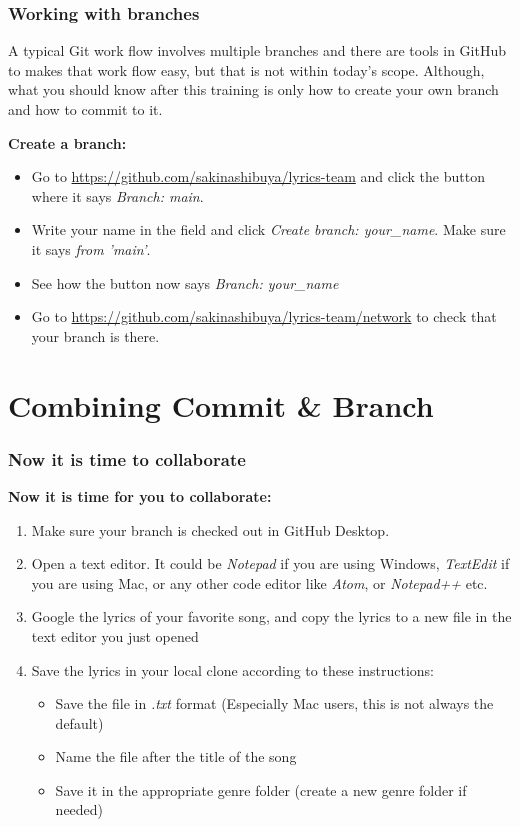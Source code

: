 \documentclass[aspectratio=169]{beamer} %
\newcommand{\trainingURL}[1]{{\color{blue}\url{#1}}}
\newcommand{\traininerUsername}{sakinashibuya}
\newcommand{\repoName}{\traininerUsername/lyrics-team}
\newcommand{\trainingRepoURL}[1]{\trainingURL{https://github.com/\repoName #1}}
\begin{document}
\begin{frame}
\frametitle{Working with branches}

	A typical Git work flow involves multiple branches and there are tools in GitHub to makes that work flow easy, but that is not within today's scope. Although, what you should know after this training is only how to create your own branch and how to commit to it.

	\textbf{Create a branch:}
	\begin{itemize}
		\item Go to \trainingRepoURL{} and click the button where it says \textit{Branch: main}.
		\item Write your name in the field and click \textit{Create branch: your\_name}. Make sure it says \textit{from 'main'}.
		\item See how the button now says \textit{Branch: your\_name}
		\item Go to \trainingRepoURL{/network} to check that your branch is there.
	\end{itemize}

\end{frame}

\section{Combining Commit \& Branch}

\begin{frame}
\frametitle{Now it is time to collaborate}

\textbf{Now it is time for you to collaborate:}
\begin{enumerate}
	\item Make sure your branch is checked out in GitHub Desktop.
	\item Open a text editor. It could be \textit{Notepad} if you are using Windows, \textit{TextEdit} if you are using Mac, or any other code editor like \textit{Atom}, or \textit{Notepad++} etc.
	\item Google the lyrics of your favorite song, and copy the lyrics to a new file in the text editor you just opened
	\item Save the lyrics in your local clone according to these instructions:
	\begin{itemize}
		\item Save the file in \textit{.txt} format (Especially Mac users, this is not always the default)
		\item Name the file after the title of the song
		\item Save it in the appropriate genre folder (create a new genre folder if needed)
	\end{itemize}
\end{enumerate}

\end{frame}
\end{document}
